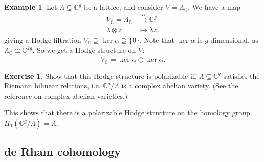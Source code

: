 \documentclass{article}
\theoremstyle{definition}
\newtheorem*{example}{Example}
\newtheorem*{exercise}{Exercise}
\newcommand{\conj}[1]{\overline{#1}}
\newcommand{\Q}{\mathbb{Q}}
\newcommand{\C}{\mathbb{C}}
\begin{document}
\begin{example}
    Let $\Lambda\subseteq\C^g$ be a lattice, and consider $V=\Lambda_\Q$. We
    have a map
    \begin{align*}
        V_\C = \Lambda_\C &\xrightarrow\alpha \C^g \\
        \lambda\otimes z &\mapsto \lambda z,
    \end{align*}
    giving a Hodge filtration $V_\C\supseteq\ker\alpha\supseteq\{0\}$. Note that
    $\ker\alpha$ is $g$-dimensional, as $\Lambda_\C\cong\C^{2g}$. So we get a
    Hodge structure on $V$:
    \begin{equation*}
        V_\C = \ker\alpha \oplus \conj{\ker\alpha}.
    \end{equation*}
\end{example}

\begin{exercise}
    Show that this Hodge structure is polarizable iff $\Lambda\subseteq\C^g$
    satisfies the Riemann bilinear relations, i.e. $\C^g/\Lambda$ is a complex
    abelian variety. (See the reference on complex abelian varieties.)

    This shows that there is a polarizable Hodge structure on the homology group
    $H_1(\C^g/\Lambda)=\Lambda$.
\end{exercise}

\subsection*{de Rham cohomology}
\end{document}
